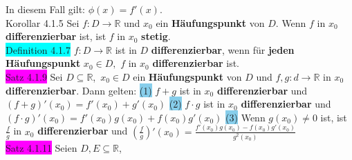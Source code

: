 \documentclass[landscape, 10pt]{article}
\newcommand{\R}{\mathbb{R}}
\begin{document}
\begin{multicols}{3}
                     In diesem Fall gilt: \textcolor{NavyBlue}{$\phi(x)=f'(x)$}.\\
              \colorbox{BurntOrange}{Korollar 4.1.5} 
                     Sei \textcolor{NavyBlue}{$f:D\longrightarrow\R$}
                     und \textcolor{NavyBlue}{$x_0$} ein \textbf{Häufungspunkt} von 
                     \textcolor{NavyBlue}{$D$}. 
                     Wenn \textcolor{NavyBlue}{$f$} in \textcolor{NavyBlue}{$x_0$} 
                     \textbf{differenzierbar} ist, ist \textcolor{NavyBlue}{$f$} in 
                     \textcolor{NavyBlue}{$x_0$} 
                     \textbf{stetig}.\\
              \colorbox{cyan}{Definition 4.1.7} 
                     \textcolor{NavyBlue}{$f:D\longrightarrow\R$} 
                     ist in \textcolor{NavyBlue}{$D$} \textbf{differenzierbar}, 
                     wenn für \textbf{jeden Häufungspunkt} $x_0\in D,$
                     \textcolor{NavyBlue}{$f$} in \textcolor{NavyBlue}{$x_0$} 
                     \textbf{differenzierbar} ist.\\
              \colorbox{magenta}{Satz 4.1.9} 
                     Sei \textcolor{NavyBlue}{$D\subseteq\R$},\,
                     \textcolor{NavyBlue}{$x_0\in D$} 
                     ein \textbf{Häufungspunkt} von \textcolor{NavyBlue}{$D$} 
                     und \textcolor{NavyBlue}{$f,g:d\longrightarrow\R$} in 
                     \textcolor{NavyBlue}{$x_0$} \textbf{differenzierbar}. Dann gelten:
                     \colorbox{SkyBlue}{(1)} \textcolor{NavyBlue}{$f+g$}
                     ist in \textcolor{NavyBlue}{$x_0$} \textbf{differenzierbar} und 
                     \textcolor{NavyBlue}{$(f+g)'(x_0)=f'(x_0)+g'(x_0)$} 
                     \colorbox{SkyBlue}{(2)} \textcolor{NavyBlue}{$f\cdot g$} 
                     ist in \textcolor{NavyBlue}{$x_0$} \textbf{differenzierbar} und 
                     \textcolor{NavyBlue}{
                     $(f\cdot g)'(x_0)=f'(x_0)g(x_0)+f(x_0)g'(x_0)$} 
                     \colorbox{SkyBlue}{(3)} Wenn 
                     \textcolor{NavyBlue}{$g(x_0)\neq0$} ist, ist 
                     \textcolor{NavyBlue}{$\frac{f}{g}$} in 
                     \textcolor{NavyBlue}{$x_0$} \textbf{differenzierbar} und 
                     \textcolor{NavyBlue}{
                     $(\frac{f}{g})'(x_0)
                     =\frac{f'(x_0)g(x_0)-f(x_0)g'(x_0)}{g^2(x_0)}$} \\
              \colorbox{magenta}{Satz 4.1.11}
                     Seien \textcolor{NavyBlue}{$D,E\subseteq\R$}, 

\end{multicols}
\end{document}
